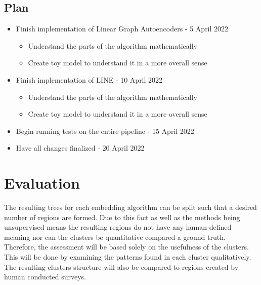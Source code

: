 \documentclass[conference]{IEEEtran}
\begin{document}
	\subsection{Plan}
	\begin{itemize}
		\item Finish implementation of Linear Graph Autoencoders - 5 April 2022
		\begin{itemize}
			\item Understand the parts of the algorithm mathematically
			\item Create toy model to understand it in a more overall sense
		\end{itemize}
		
		\item Finish implementation of LINE - 10 April 2022
		\begin{itemize}
			\item Understand the parts of the algorithm mathematically
			\item Create toy model to understand it in a more overall sense
		\end{itemize}
		
		\item Begin running tests on the entire pipeline - 15 April 2022
		\item Have all changes finalized - 20 April 2022
	\end{itemize}
	
	
	\section{Evaluation}
	The resulting trees for each embedding algorithm can be split such that a desired number of regions are formed. Due to this fact as well as the methods being unsupervised means the resulting regions do not have any human-defined meaning nor can the clusters be quantitative compared a ground truth. Therefore, the assessment will be based solely on the usefulness of the clusters. This will be done by examining the patterns found in each cluster qualitatively. The resulting clusters structure will also be compared to regions created by human conducted surveys.
	
\end{document}
